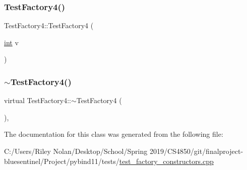 \mbox{\label{class_test_factory4_a5e0efb19a84e3fe959733f5719af02ca}} 
\subsubsection{\texorpdfstring{TestFactory4()}{TestFactory4()}\hspace{0.1cm}{\footnotesize\ttfamily [2/2]}}
{\footnotesize\ttfamily Test\+Factory4\+::\+Test\+Factory4 (\begin{DoxyParamCaption}\item[{\mbox{\hyperlink{warnings_8h_a74f207b5aa4ba51c3a2ad59b219a423b}{int}}}]{v }\end{DoxyParamCaption})\hspace{0.3cm}{\ttfamily [inline]}}

\mbox{\label{class_test_factory4_a76462e5b4224fa898deb6a74976fe6c6}} 
\subsubsection{\texorpdfstring{$\sim$TestFactory4()}{~TestFactory4()}}
{\footnotesize\ttfamily virtual Test\+Factory4\+::$\sim$\+Test\+Factory4 (\begin{DoxyParamCaption}{ }\end{DoxyParamCaption})\hspace{0.3cm}{\ttfamily [inline]}, {\ttfamily [virtual]}}



The documentation for this class was generated from the following file\+:\begin{DoxyCompactItemize}
\item 
C\+:/\+Users/\+Riley Nolan/\+Desktop/\+School/\+Spring 2019/\+C\+S4850/git/finalproject-\/bluesentinel/\+Project/pybind11/tests/\mbox{\hyperlink{test__factory__constructors_8cpp}{test\+\_\+factory\+\_\+constructors.\+cpp}}\end{DoxyCompactItemize}
